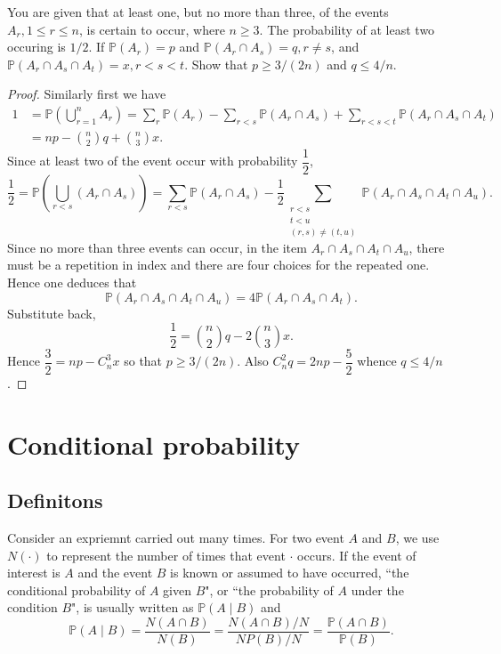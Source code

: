 \documentclass[11pt,singlecolumn, openany, citestyle=authoryear]{elegantbook}
\begin{document}
\begin{CJK}{UTF8}{gbsn}
\begin{exercise}
    You are given that at least one, but no more than three, of the events
    $A_r, 1 \leqslant r \leqslant n$, is certain to occur, where $n \geqslant 3$.
    The probability of at least two occuring is $1/2$. 
    If $\mathbb{P}(A_r)=p$ and $\mathbb{P}(A_r \cap A_s)=q, r \neq s$,
    and $\mathbb{P}(A_r \cap A_s \cap A_t)=x, r < s <t$. Show that $p \geqslant 3/(2n)$ 
    and $q \leqslant 4/n$.
\end{exercise}
\begin{proof}
    Similarly first we have 
    \begin{align*}
        1 & = \mathbb{P}(\bigcup_{r=1}^nA_r) = \sum_{r}\mathbb{P}(A_r)-
        \sum_{r < s}\mathbb{P}(A_r \cap A_s) + \sum_{r<s<t} \mathbb{P}(A_r \cap A_s \cap A_t) \\
        & = np - \binom{n}{2}q + \binom{n}{3}x.
    \end{align*}
    Since at least two of the event occur with probability $\dfrac{1}{2}$,
    $$
        \frac{1}{2}=\mathbb{P}\left(\bigcup_{r < s}(A_r \cap A_s)\right) = 
        \sum_{r < s}\mathbb{P}(A_r \cap A_s) -\frac{1}{2}\sum_{\substack{r < s\\t < u\\(r,s)\neq (t,u)}}
        \mathbb{P}(A_r \cap A_s \cap A_t \cap A_u).
    $$
    Since no more than three events can occur, in the item $A_r \cap A_s \cap A_t \cap A_u$,
    there must be a repetition in index and there are four choices for the repeated one. 
    Hence one deduces that 
    $$
    \mathbb{P}(A_r \cap A_s \cap A_t \cap A_u) = 4\mathbb{P}(A_r \cap A_s \cap A_t). 
    $$
    Substitute back, 
    $$
    \frac{1}{2}=\binom{n}{2}q - 2\binom{n}{3}x.
    $$
    Hence $\dfrac{3}{2}=np - C_n^3 x$ so that $p \geqslant 3/(2n)$. Also 
    $C_n^2 q = 2np - \dfrac{5}{2}$ whence $q \leqslant 4/n$.
\end{proof}



\section{Conditional probability}
\subsection{Definitons}
\begin{definition}
    Consider an expriemnt carried out many times. For two event $A$ and $B$, we use 
    $N(\cdot)$ to represent the number of times that event $\cdot$ occurs. 
    If the event of interest is $A$ and the event $B$ is known or assumed to have occurred,
    ``the conditional probability of
    $A$ given $B$", or ``the probability of $A$ under the condition $B$", is usually
    written as $\mathbb{P}(A \mid B)$ and 
    $$
    \mathbb{P}(A\mid B) = \frac{N(A \cap B)}{N(B)}=
    \frac{N(A \cap B)/N}{N{P}(B)/N}=
    \frac{\mathbb{P}(A \cap B)}{\mathbb{P}(B)}.
    $$
\end{definition}


\end{CJK}
\end{document}
